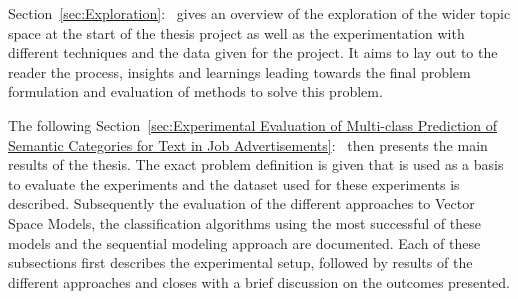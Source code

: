 Section~\ref{sec:Exploration}:~ gives an overview of the exploration of the wider topic space at the start of the thesis project as well as the experimentation with different techniques and the data given for the project. It aims to lay out to the reader the process, insights and learnings leading towards the final problem formulation and evaluation of methods to solve this problem.

The following Section~\ref{sec:Experimental Evaluation of Multi-class Prediction of Semantic Categories for Text in Job Advertisements}:~ then presents the main results of the thesis. The exact problem definition is given that is used as a basis to evaluate the experiments and the dataset used for these experiments is described.
Subsequently the evaluation of the different approaches to Vector Space Models, the classification algorithms using the most successful of these models and the sequential modeling approach are documented. Each of these subsections first describes the experimental setup, followed by results of the different approaches and closes with a brief discussion on the outcomes presented.
